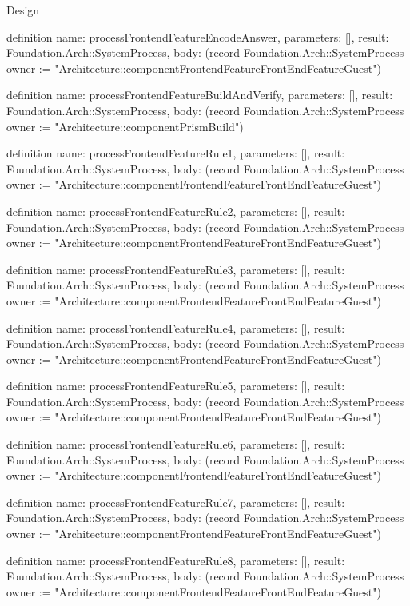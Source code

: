 \begin{lexlean}{Design}
\begin{semanticmodule}
definition{
  name: processFrontendFeatureEncodeAnswer,
  parameters: [],
  result: Foundation.Arch::SystemProcess,
  body: (record Foundation.Arch::SystemProcess {owner := "Architecture::componentFrontendFeatureFrontEndFeatureGuest"})
}

definition{
  name: processFrontendFeatureBuildAndVerify,
  parameters: [],
  result: Foundation.Arch::SystemProcess,
  body: (record Foundation.Arch::SystemProcess {owner := "Architecture::componentPrismBuild"})
}

definition{
  name: processFrontendFeatureRule1,
  parameters: [],
  result: Foundation.Arch::SystemProcess,
  body: (record Foundation.Arch::SystemProcess {owner := "Architecture::componentFrontendFeatureFrontEndFeatureGuest"})
}

definition{
  name: processFrontendFeatureRule2,
  parameters: [],
  result: Foundation.Arch::SystemProcess,
  body: (record Foundation.Arch::SystemProcess {owner := "Architecture::componentFrontendFeatureFrontEndFeatureGuest"})
}

definition{
  name: processFrontendFeatureRule3,
  parameters: [],
  result: Foundation.Arch::SystemProcess,
  body: (record Foundation.Arch::SystemProcess {owner := "Architecture::componentFrontendFeatureFrontEndFeatureGuest"})
}

definition{
  name: processFrontendFeatureRule4,
  parameters: [],
  result: Foundation.Arch::SystemProcess,
  body: (record Foundation.Arch::SystemProcess {owner := "Architecture::componentFrontendFeatureFrontEndFeatureGuest"})
}

definition{
  name: processFrontendFeatureRule5,
  parameters: [],
  result: Foundation.Arch::SystemProcess,
  body: (record Foundation.Arch::SystemProcess {owner := "Architecture::componentFrontendFeatureFrontEndFeatureGuest"})
}

definition{
  name: processFrontendFeatureRule6,
  parameters: [],
  result: Foundation.Arch::SystemProcess,
  body: (record Foundation.Arch::SystemProcess {owner := "Architecture::componentFrontendFeatureFrontEndFeatureGuest"})
}

definition{
  name: processFrontendFeatureRule7,
  parameters: [],
  result: Foundation.Arch::SystemProcess,
  body: (record Foundation.Arch::SystemProcess {owner := "Architecture::componentFrontendFeatureFrontEndFeatureGuest"})
}

definition{
  name: processFrontendFeatureRule8,
  parameters: [],
  result: Foundation.Arch::SystemProcess,
  body: (record Foundation.Arch::SystemProcess {owner := "Architecture::componentFrontendFeatureFrontEndFeatureGuest"})
}


\end{semanticmodule}
\end{lexlean}
